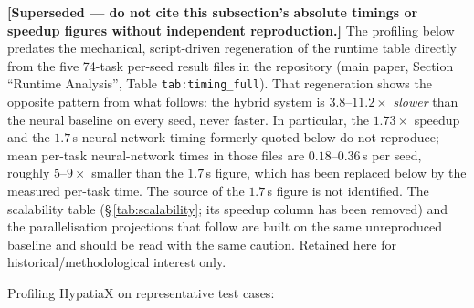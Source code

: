 \documentclass[twoside,11pt]{article}
\begin{document}
\textbf{[Superseded --- do not cite this subsection's absolute timings or
speedup figures without independent reproduction.]} The profiling below
predates the mechanical, script-driven regeneration of the runtime table
directly from the five 74-task per-seed result files in the repository
(main paper, Section ``Runtime Analysis'', Table \texttt{tab:timing\_full}). That regeneration
shows the opposite pattern from what follows: the hybrid system is
$3.8$--$11.2\times$ \emph{slower} than the neural baseline on every seed,
never faster. In particular, the $1.73\times$ speedup
and the $1.7$\,s neural-network timing formerly quoted below do not reproduce;
mean per-task neural-network times in those files are $0.18$--$0.36$\,s per seed,
roughly $5$--$9\times$ smaller than the $1.7$\,s figure,
which has been replaced below by the measured per-task time. The source of the $1.7$\,s figure is not identified. The scalability table (\S\,\ref{tab:scalability}; its speedup column has been removed)
and the parallelisation projections that follow are built on the same
unreproduced baseline and should be read with the same caution. Retained
here for historical/methodological interest only.

Profiling HypatiaX on representative test cases:
\end{document}
